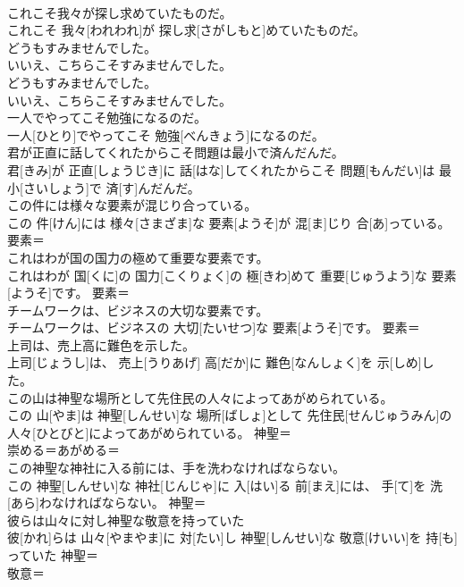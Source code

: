 \documentclass[8pt]{extreport}
\begin{document}
\begin{CJK}{UTF8}{min}
\\	これこそ我々が探し求めていたものだ。	
\\	これこそ 我々[われわれ]が 探し求[さがしもと]めていたものだ。	
\\	どうもすみませんでした。 
\\	いいえ、こちらこそすみませんでした。	
\\	どうもすみませんでした。 
\\	いいえ、こちらこそすみませんでした。	
\\	一人でやってこそ勉強になるのだ。	
\\	一人[ひとり]でやってこそ 勉強[べんきょう]になるのだ。	
\\	君が正直に話してくれたからこそ問題は最小で済んだんだ。	
\\	君[きみ]が 正直[しょうじき]に 話[はな]してくれたからこそ 問題[もんだい]は 最小[さいしょう]で 済[す]んだんだ。	
\\	この件には様々な要素が混じり合っている。	
\\	この 件[けん]には 様々[さまざま]な 要素[ようそ]が 混[ま]じり 合[あ]っている。	要素＝ 
\\	これはわが国の国力の極めて重要な要素です。	
\\	これはわが 国[くに]の 国力[こくりょく]の 極[きわ]めて 重要[じゅうよう]な 要素[ようそ]です。	要素＝ 
\\	チームワークは、ビジネスの大切な要素です。	
\\	チームワークは、ビジネスの 大切[たいせつ]な 要素[ようそ]です。	要素＝ 
\\	上司は、売上高に難色を示した。	
\\	上司[じょうし]は、 売上[うりあげ] 高[だか]に 難色[なんしょく]を 示[しめ]した。	
\\	この山は神聖な場所として先住民の人々によってあがめられている。	
\\	この 山[やま]は 神聖[しんせい]な 場所[ばしょ]として 先住民[せんじゅうみん]の 人々[ひとびと]によってあがめられている。	神聖＝ 
\\	崇める＝あがめる＝ 
\\	この神聖な神社に入る前には、手を洗わなければならない。	
\\	この 神聖[しんせい]な 神社[じんじゃ]に 入[はい]る 前[まえ]には、 手[て]を 洗[あら]わなければならない。	神聖＝ 
\\	彼らは山々に対し神聖な敬意を持っていた	
\\	彼[かれ]らは 山々[やまやま]に 対[たい]し 神聖[しんせい]な 敬意[けいい]を 持[も]っていた	神聖＝ 
\\	敬意＝ 

\end{CJK}
\end{document}
